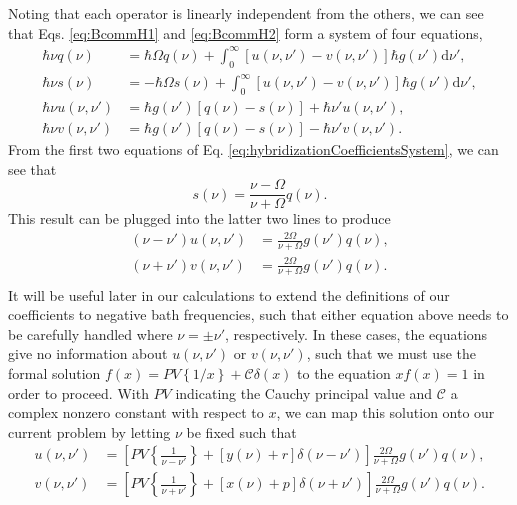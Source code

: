 \documentclass{article}
\begin{document}
Noting that each operator is linearly independent from the others, we can see that Eqs. \eqref{eq:BcommH1} and \eqref{eq:BcommH2} form a system of four equations,
\begin{equation}\label{eq:hybridizationCoefficientsSystem}
\begin{split}
\hbar\nu q(\nu) &= \hbar\Omega q(\nu) + \int_0^\infty\left[u(\nu,\nu') - v(\nu,\nu')\right]\hbar g(\nu')\mathrm{d}\nu',\\
\hbar\nu s(\nu) &= -\hbar\Omega s(\nu) + \int_0^\infty\left[u(\nu,\nu') - v(\nu,\nu')\right]\hbar g(\nu')\mathrm{d}\nu',\\
\hbar\nu u(\nu,\nu') &= \hbar g(\nu')[q(\nu) - s(\nu)] + \hbar\nu'u(\nu,\nu'),\\
\hbar\nu v(\nu,\nu') &= \hbar g(\nu')[q(\nu) - s(\nu)] - \hbar\nu'v(\nu,\nu').
\end{split}
\end{equation}
From the first two equations of Eq. \eqref{eq:hybridizationCoefficientsSystem}, we can see that
\begin{equation}
s(\nu) = \frac{\nu - \Omega}{\nu + \Omega}q(\nu).
\end{equation}
This result can be plugged into the latter two lines to produce
\begin{equation}
\begin{split}
(\nu - \nu')u(\nu,\nu') &= \frac{2\Omega}{\nu + \Omega} g(\nu')q(\nu),\\
(\nu + \nu')v(\nu,\nu') &= \frac{2\Omega}{\nu + \Omega} g(\nu')q(\nu).\\
\end{split}
\end{equation}
It will be useful later in our calculations to extend the definitions of our coefficients to negative bath frequencies, such that either equation above needs to be carefully handled where $\nu = \pm\nu'$, respectively. In these cases, the equations give no information about $u(\nu,\nu')$ or $v(\nu,\nu')$, such that we must use the formal solution $f(x) = PV\left\{1/x\right\} + \mathcal{C}\delta(x)$ to the equation $xf(x) = 1$ in order to proceed. With $PV$ indicating the Cauchy principal value and $\mathcal{C}$ a complex nonzero constant with respect to $x$, we can map this solution onto our current problem by letting $\nu$ be fixed such that 
\begin{equation}
\begin{split}
u(\nu,\nu') &= \left[PV\left\{\frac{1}{\nu - \nu'}\right\} + [y(\nu) + r]\delta(\nu - \nu')\right]\frac{2\Omega}{\nu + \Omega}g(\nu')q(\nu),\\
v(\nu,\nu') &= \left[PV\left\{\frac{1}{\nu + \nu'}\right\} + [x(\nu) + p]\delta(\nu + \nu')\right]\frac{2\Omega}{\nu + \Omega}g(\nu')q(\nu).
\end{split}
\end{equation}
\end{document}
